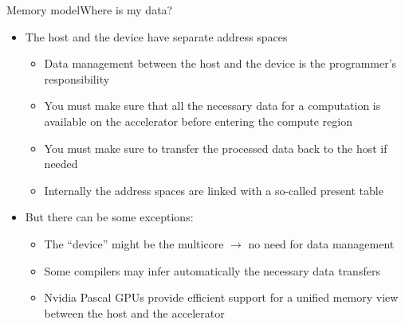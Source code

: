 \documentclass[12pt,aspectratio=169]{beamer}
\begin{document}
\begin{frame}[fragile]{Memory model}{Where is my data?}
  \begin{itemize}
  \item The host and the device have separate address spaces
    \begin{itemize}
    \item Data management between the host and the device is the programmer's responsibility
    \item You must make sure that all the necessary data for a computation is available on the accelerator before entering the compute region
    \item You must make sure to transfer the processed data back to the host if needed
    \item Internally the address spaces are linked with a so-called present table
    \end{itemize}
    \pause
    \vspace\baselineskip
  \item But there can be some exceptions:
    \begin{itemize}
    \item The ``device'' might be the multicore $\rightarrow$ no need for data management
    \item Some compilers may infer automatically the necessary data transfers
    \item Nvidia Pascal GPUs provide efficient support for a unified memory view between the host and the accelerator
    \end{itemize}
  \end{itemize}
\end{frame}
\end{document}
